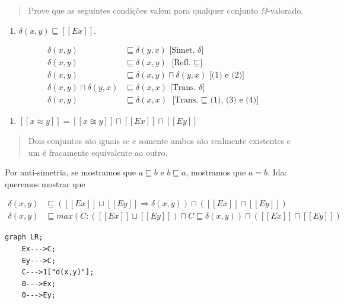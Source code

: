 \begin{quote}
Prove que as seguintes condições valem para qualquer conjunto
\(\Omega\)-valorado.
\end{quote}

\begin{enumerate}
\def\labelenumi{\arabic{enumi}.}
\tightlist
\item
  \(\delta (x, y) \sqsubseteq [[ Ex ]]\).
\end{enumerate}

\begin{align}
\delta(x,y) &\sqsubseteq \delta (y, x) \text{ [Simet. $\delta$]} \\
\delta(x,y) &\sqsubseteq \delta (x, y) \text{ [Refl. $\sqsubseteq$]} \\
\delta(x,y) &\sqsubseteq \delta (x, y) \sqcap \delta(y, x) \text{ [(1) e (2)]} \\
\delta (x, y) \sqcap \delta(y, x) &\sqsubseteq \delta (x, x) \text{ [Trans. $\delta$]} \\
\delta (x, y) &\sqsubseteq \delta(x,x) \text{ [Trans. $\sqsubseteq$ (1), (3) e (4)]}
\end{align}

\begin{enumerate}
\def\labelenumi{\arabic{enumi}.}
\setcounter{enumi}{1}
\tightlist
\item
  \([[ x \approx y ]] = [[ x \approxeq y]] \sqcap [[Ex]] \sqcap [[Ey]]\)
\end{enumerate}

\begin{quote}
Dois conjuntos são iguais se e somente ambos são realmente existentes e
um é fracamente equivalente ao outro.
\end{quote}

Por anti-simetria, se mostramos que \(a \sqsubseteq b\) e
\(b \sqsubseteq a\), mostramos que \(a = b\). Ida: queremos mostrar que

\begin{align}
\delta(x,y) &\sqsubseteq ([[Ex]] \sqcup [[Ey]] \Rightarrow \delta(x,y)) \sqcap ([[Ex]] \sqcap [[Ey]]) \\
\delta(x,y) &\sqsubseteq max(C : ([[Ex]] \sqcup [[Ey]]) \sqcap C \sqsubseteq \delta(x,y)) \sqcap ([[Ex]] \sqcap [[Ey]])
\end{align}

\begin{verbatim}
graph LR;
    Ex--->C;
    Ey--->C;
    C--->1["d(x,y)"];
    0--->Ex;
    0--->Ey;
\end{verbatim}

